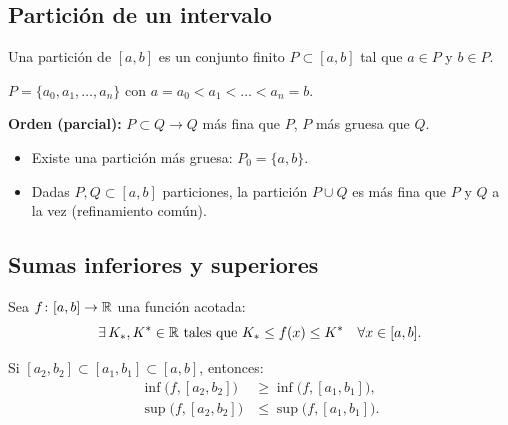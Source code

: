 \documentclass[11pt,a4paper]{article}
\begin{document}

\subsection{Partición de un intervalo}

\begin{definicion}
Una partición de $[a,b]$ es un conjunto finito $P\subset[a,b]$ tal que $a\in P$ y $b\in P$.
\end{definicion}

\begin{notacion}
$P=\{a_0,a_1,\dots,a_n\}$ con $a=a_0<a_1<\dots<a_n=b$.
\end{notacion}

\textbf{Orden (parcial):} $P\subset Q \to Q$ más fina que $P$, $P$ más gruesa que $Q$.
\begin{itemize}
  \item Existe una partición más gruesa: $P_0=\{a,b\}$.
  \item Dadas $P,Q\subset[a,b]$ particiones, la partición $P\cup Q$ es más fina que $P$ y $Q$ a la vez (refinamiento común).
\end{itemize}

\subsection{Sumas inferiores y superiores}

Sea $f\colon[a,b]\to\mathbb{R}$ una función acotada:
\[
  \exists\,K_*,K^*\in\mathbb{R} \text{ tales que } K_*\le f(x)\le K^* \quad \forall x\in[a,b].
\]

\begin{center}
\end{center}

\begin{lema}
Si $[a_2,b_2]\subset[a_1,b_1]\subset[a,b]$, entonces:
\begin{align*}
  \inf\bigl(f,[a_2,b_2]\bigr) &\ge \inf\bigl(f,[a_1,b_1]\bigr),\\
  \sup\bigl(f,[a_2,b_2]\bigr) &\le \sup\bigl(f,[a_1,b_1]\bigr).
\end{align*}
\end{lema}
\end{document}
